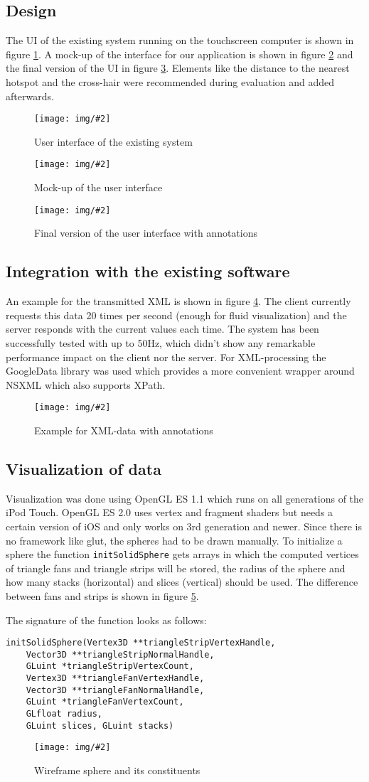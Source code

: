 \documentclass{scrartcl}
\newcommand{\graphic}[3][width=\linewidth] %
{
  \begin{figure}[h!t]
    \centering
    \texttt{[image: img/\#2]}
    \caption{#3}
    \label{fig:#2}
  \end{figure}
}
\newcommand{\refFigure}[1]{figure \ref{fig:#1}}
\begin{document}
\subsection{Design}
The UI of the existing system running on the touchscreen computer is shown in \refFigure{server2}.
A mock-up of the interface for our application is shown in \refFigure{mockup} and the final version of the UI in \refFigure{screen-annotated}. Elements like the distance to the nearest hotspot and the cross-hair were recommended during evaluation and added afterwards.
\graphic[scale=.43]{server2}{User interface of the existing system}
\graphic[scale=.5]{mockup}{Mock-up of the user interface}
\graphic[scale=.5]{screen-annotated}{Final version of the user interface with annotations}


\subsection{Integration with the existing software}
An example for the transmitted XML is shown in \refFigure{data}. The client currently requests this data 20 times per second (enough for fluid visualization) and the server responds with the current values each time. The system has been successfully tested with up to 50Hz, which didn't show any remarkable performance impact on the client nor the server.
For XML-processing the GoogleData library was used which provides a more convenient wrapper around NSXML which also supports XPath.
\graphic[scale=.5]{data}{Example for XML-data with annotations}


\subsection{Visualization of data}
Visualization was done using OpenGL ES 1.1 which runs on all generations of the iPod Touch. OpenGL ES 2.0 uses vertex and fragment shaders but needs a certain version of iOS and only works on 3rd generation and newer.
Since there is no framework like glut, the spheres had to be drawn manually. To initialize a sphere the function \verb|initSolidSphere| gets arrays in which the computed vertices of triangle fans and triangle strips will be stored, the radius of the sphere and how many stacks (horizontal) and slices (vertical) should be used.
The difference between fans and strips is shown in \refFigure{sphere}.

The signature of the function looks as follows:
\begin{verbatim}
initSolidSphere(Vertex3D **triangleStripVertexHandle,
    Vector3D **triangleStripNormalHandle,
    GLuint *triangleStripVertexCount,
    Vertex3D **triangleFanVertexHandle,
    Vector3D **triangleFanNormalHandle,
    GLuint *triangleFanVertexCount,
    GLfloat radius,
    GLuint slices, GLuint stacks)
\end{verbatim}
\graphic[scale=.5]{sphere}{Wireframe sphere and its constituents}
\end{document}
